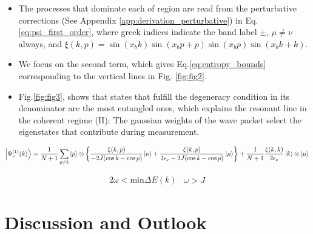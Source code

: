 \documentclass[10pt,
 amsmath,amssymb,
 aps,prb, twocolumn
]{revtex4-2}
\begin{document}
\begin{itemize}
    \item The processes that dominate each of region are read from the perturbative corrections (See Appendix \ref{app:derivation_perturbative}) in Eq.\eqref{eq:psi_first_order}, where greek indices indicate the band label $\pm$, $\mu \neq \nu$ always, and $\xi(k,p) = \sin{(x_bk)}\sin{(x_b p+p)}\sin{(x_b p)}\sin{(x_b k+k)}$.

    \item We focus on the second term, which gives Eq.\eqref{eq:entropy_bounds} corresponding to the vertical lines in Fig. \ref{fig:fig2}.

    \item Fig.\ref{fig:fig3}, shows that states that fulfill the degeneracy condition in its denominator are the most entangled ones, which explains the resonant line in the coherent regime (II): The gaussian weights of the wave packet select the eigenstates that contribute during measurement.
\end{itemize}

\begin{widetext}
\begin{equation}
    \ket{\Psi_\nu^{(1)} (k)} = \frac{1}{N+1} \sum_{p \neq k} \ket{p} \otimes \left\{\frac{\xi(k,p)}{-2J(\cos k - \cos p)} \ket{\nu} + \frac{\xi(k,p)}{2\epsilon_\nu - 2J(\cos k - \cos p)} \ket{\mu} \right\} + \frac{1}{N+1} \frac{\xi(k,k)}{2\epsilon_\nu} \ket{k} \otimes \ket{\mu}\label{eq:psi_first_order}
\end{equation}
\end{widetext}


\begin{subequations}\label{eq:entropy_bounds}
\begin{align}
    2\omega < \text{min}\Delta E (k)
\end{align}
\begin{align}
    \omega  > J  
\end{align}
\end{subequations}


\section{Discussion and Outlook}
\end{document}
